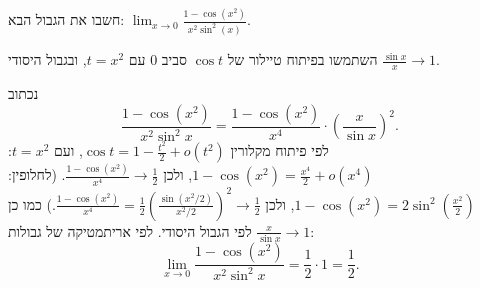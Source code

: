 
\begin{question}
חשבו את הגבול הבא: $\lim_{x\to 0}\frac{1-\cos(x^2)}{x^2\sin^2(x)}$.
\end{question}

\begin{hint}
השתמשו בפיתוח טיילור של $\cos t$ סביב $0$ עם $t=x^2$, ובגבול היסודי $\frac{\sin x}{x}\to1$.
\end{hint}

\begin{solution}
נכתוב
\[ \frac{1-\cos(x^2)}{x^2\sin^2 x}=\frac{1-\cos(x^2)}{x^4}\cdot\left(\frac{x}{\sin x}\right)^2. \]
לפי פיתוח מקלורין $\cos t=1-\frac{t^2}{2}+o(t^2)$, ועם $t=x^2$: $1-\cos(x^2)=\frac{x^4}{2}+o(x^4)$, ולכן $\frac{1-\cos(x^2)}{x^4}\to\frac12$.
(לחלופין: $1-\cos(x^2)=2\sin^2(\frac{x^2}{2})$, ולכן $\frac{1-\cos(x^2)}{x^4}=\frac12\left(\frac{\sin(x^2/2)}{x^2/2}\right)^2\to\frac12$.)
כמו כן $\frac{x}{\sin x}\to 1$ לפי הגבול היסודי. לפי אריתמטיקה של גבולות:
\[ \lim_{x\to0}\frac{1-\cos(x^2)}{x^2\sin^2 x}=\frac12\cdot 1=\boxed{\frac12}. \]
\end{solution}
